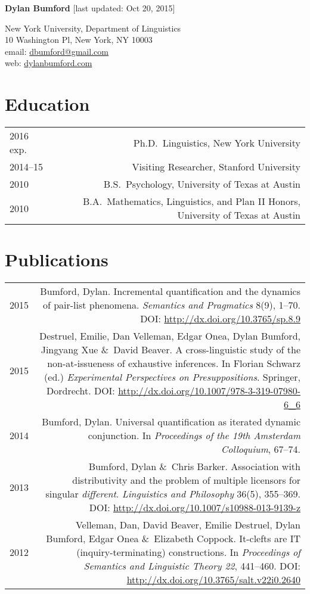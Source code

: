 \documentclass[11pt]{article}
\newcommand{\doi}[1]{\url{http://dx.doi.org/#1}}
\newcommand{\with}{\&}
\begin{document}
\textbf{Dylan Bumford}\hfill
{\color{gray}[last updated: Oct 20, 2015]}

\bigskip

New York University, Department of Linguistics\\
10 Washington Pl, New York, NY 10003\\
email: \href{mailto:dbumford@gmail.com}{dbumford@gmail.com}\\
web: \url{dylanbumford.com}

\bigskip

\section*{Education}

\begin{longtable}{LR}
  2016 exp.   & Ph.D.~Linguistics, New York University\\
  2014--15    & Visiting Researcher, Stanford University\\
  2010        & B.S.~Psychology, University of Texas at Austin\\
  2010        & B.A.~Mathematics, Linguistics, and Plan II Honors, University of
                Texas at Austin
\end{longtable}

\section*{Publications}

\begin{longtable}{LR}
  2015 & Bumford, Dylan. Incremental quantification and the dynamics of
         pair-list phenomena. \textit{Semantics and Pragmatics} 8(9), 1--70.
         DOI: \doi{10.3765/sp.8.9}\\
  2015 & Destruel, Emilie, Dan Velleman, Edgar Onea, Dylan Bumford, Jingyang Xue
         \with~David Beaver. A cross-linguistic study of the non-at-issueness
         of exhaustive inferences. In Florian Schwarz (ed.)
         \textit{Experimental Perspectives on Presuppositions}. Springer,
         Dordrecht. DOI: \doi{10.1007/978-3-319-07980-6_6}\\
  2014 & Bumford, Dylan. Universal quantification as iterated dynamic
         conjunction. In \textit{Proceedings of the 19th Amsterdam
         Colloquium}, 67--74.\\
  2013 & Bumford, Dylan \with~Chris Barker. Association with distributivity
         and the problem of multiple licensors for singular
         \textit{different}. \textit{Linguistics and Philosophy} 36(5),
         355--369. DOI: \doi{10.1007/s10988-013-9139-z}\\ %
  2012 & Velleman, Dan, David Beaver, Emilie Destruel, Dylan Bumford, Edgar
         Onea \with~Elizabeth Coppock. It-clefts are IT (inquiry-terminating)
         constructions. In \textit{Proceedings of Semantics and Linguistic
         Theory 22}, 441--460. DOI: \doi{10.3765/salt.v22i0.2640}
\end{longtable}
\end{document}

